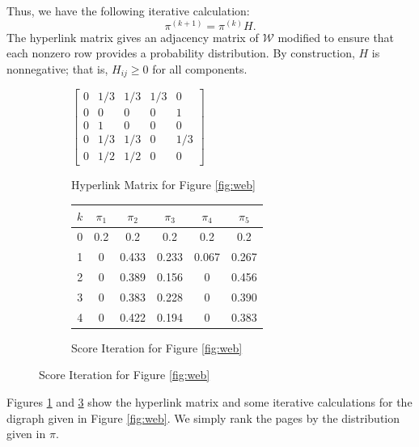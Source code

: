 \documentclass[12pt]{article}
\newcommand{\iterate}[2]{#1^{(#2)}}
\begin{document}
Thus, we have the following iterative calculation:
\begin{equation}
  \iterate{\pi}{k+1} = \iterate{\pi}{k} H.
\end{equation}
The hyperlink matrix gives an adjacency matrix of $\mathcal{W}$ modified to
ensure that each nonzero row provides a probability distribution. By
construction, $H$ is nonnegative; that is, $H_{ij}\geq 0$ for all components.
\begin{figure}[t!]
  \centering
  \begin{subfigure}
    \centering
    $\begin{bmatrix}
      0 & 1/3 & 1/3 & 1/3 & 0 \\
      0 & 0 & 0 & 0 & 1 \\
      0 & 1 & 0 & 0 & 0 \\
      0 & 1/3 & 1/3 & 0 & 1/3 \\
      0 & 1/2 & 1/2 & 0 & 0
    \end{bmatrix}$
    \caption{Hyperlink Matrix for Figure \ref{fig:web}}
    \label{fig:hyperlink}
  \end{subfigure}
  \vspace{2em}
  \begin{subfigure}
    \centering
    \begin{tabular}{|c||c|c|c|c|c|}
      \hline
      $k$ & $\pi_1$ & $\pi_2$ & $\pi_3$ & $\pi_4$ & $\pi_5$ \\
      \hline\hline
      0 & 0.2 & 0.2 & 0.2 & 0.2 & 0.2 \\
      1 & 0 & 0.433 & 0.233 & 0.067 & 0.267 \\
      2 & 0 & 0.389 & 0.156 & 0 & 0.456 \\
      3 & 0 & 0.383 & 0.228 & 0 & 0.390 \\
      4 & 0 & 0.422 & 0.194 & 0 & 0.383 \\
      \hline
    \end{tabular}
    \caption{Score Iteration for Figure \ref{fig:web}}
    \label{fig:example_calculation}
  \end{subfigure}
\end{figure}

Figures \ref{fig:hyperlink} and \ref{fig:example_calculation} show the
hyperlink matrix and some iterative calculations for the digraph given in
Figure \ref{fig:web}. We simply rank the pages by the distribution given in
$\pi$.
\end{document}
